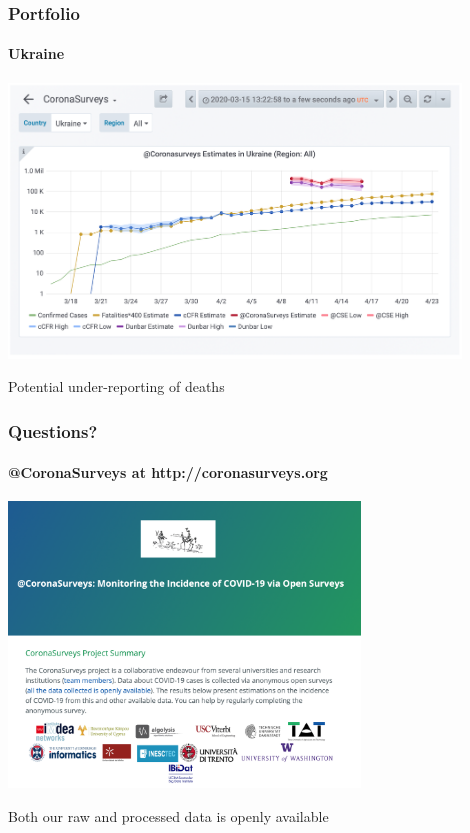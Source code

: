\documentclass{beamer}
\begin{document}
\begin{frame}
  \frametitle{Portfolio}
  \framesubtitle{Ukraine}
  \begin{center}
  \includegraphics[width=0.9\textwidth]{Ukraine.png}
  \end{center}
  Potential under-reporting of deaths
\end{frame}




\begin{frame}
  \frametitle{Questions?}
  \framesubtitle{@CoronaSurveys at http://coronasurveys.org}
  \begin{center}
  \includegraphics[width=0.7\textwidth]{CoronaSurveys.png}
  \end{center}
  Both our raw and processed data is openly available
\end{frame}
\end{document}
